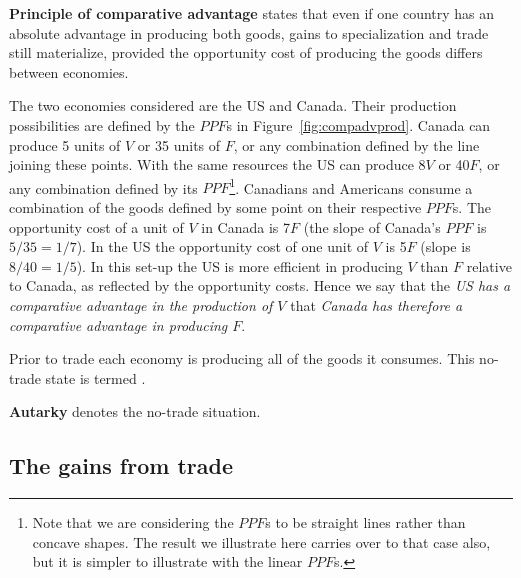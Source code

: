 \begin{DefBox}
	\textbf{Principle of comparative advantage} states that even if one country has an absolute advantage in producing both goods, gains to specialization and trade still materialize, provided the opportunity cost of producing the goods differs between economies.
\end{DefBox}

\newhtmlpage

The two economies considered are the US and Canada. Their production
possibilities are defined by the $PPF$s in Figure~\ref{fig:compadvprod}.
Canada can produce 5 units of $V$ or 35 units of $F$, or any combination
defined by the line joining these points. With the same resources the US 
can produce 8$V$ or 40$F$, or any combination defined by its $PPF$\footnote{%
	Note that we are considering the $PPF$s to be straight lines rather than
	concave shapes. The result we illustrate here carries over to that case
	also, but it is simpler to illustrate with the linear $PPF$s.}. Canadians
and Americans consume a combination of the goods defined by some point on
their respective $PPF$s. The opportunity cost of a unit of $V$ in Canada is 7$F$ 
(the slope of Canada's $PPF$ is $5/35=1/7$). In the US the opportunity
cost of one unit of $V$ is 5$F$ (slope is $8/40=1/5$). In this set-up the US
is more efficient in producing $V$ than $F$ relative to Canada, as reflected
by the opportunity costs. Hence we say that the \textit{US has a comparative
	advantage in the production of $V$}  that \textit{Canada has
	therefore a comparative advantage in producing $F$}.



\newhtmlpage

Prior to trade each economy is producing all of the goods it consumes. This
no-trade state is termed .

\begin{DefBox}
	\textbf{Autarky} denotes the no-trade situation.
\end{DefBox}

\newhtmlpage

\subsection*{The gains from trade}

